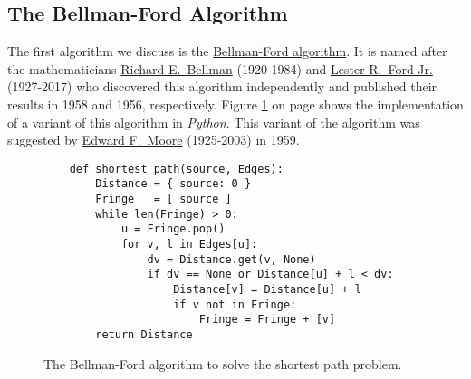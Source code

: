 \subsection{The Bellman-Ford Algorithm}
The first algorithm we discuss is the
\href{https://en.wikipedia.org/wiki/Bellman-Ford_algorithm}{Bellman-Ford algorithm}.
It is named after the mathematicians 
\href{https://en.wikipedia.org/wiki/Richard_E._Bellman}{Richard E.~Bellman} (1920-1984) \cite{bellman:58} and
\href{https://en.wikipedia.org/wiki/L._R._Ford_Jr.}{Lester R.~Ford Jr.} (1927-2017) \cite{ford:56}
who discovered this algorithm
independently and published their results in 1958 and 1956, respectively.  Figure
\ref{fig:Moore.ipynb} on page \pageref{fig:Moore.ipynb} shows the implementation of a variant of this 
algorithm in \textsl{Python}.  This variant of the algorithm was suggested by 
\href{https://en.wikipedia.org/wiki/Edward_F._Moore}{Edward F.~Moore} (1925-2003) 
\cite{moore:59}  in 1959.


\begin{figure}[!ht]
  \centering
\begin{verbatim}
    def shortest_path(source, Edges):
        Distance = { source: 0 }
        Fringe   = [ source ]
        while len(Fringe) > 0:
            u = Fringe.pop()
            for v, l in Edges[u]:
                dv = Distance.get(v, None)
                if dv == None or Distance[u] + l < dv:
                    Distance[v] = Distance[u] + l
                    if v not in Fringe: 
                        Fringe = Fringe + [v] 
        return Distance
\end{verbatim}
\vspace*{-0.3cm}
  \caption{The Bellman-Ford algorithm to solve the shortest path problem.}
  \label{fig:Moore.ipynb}
\end{figure} 

